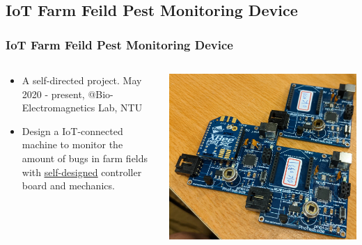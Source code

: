 \documentclass[compress, aspectratio=32]{beamer}
\begin{document}
\subsection{IoT Farm Feild Pest Monitoring Device}
\begin{frame}
    \frametitle{IoT Farm Feild Pest Monitoring Device}
    \begin{columns}
        \begin{column}{0.5\linewidth}
            \begin{itemize}
                \item A self-directed project. May 2020 - present, @Bio-Electromagnetics Lab, NTU
                \item Design a IoT-connected machine to monitor the amount of bugs in farm fields with \href{https://bencer3283.github.io/experiences/Iot/}{\underline{self-designed}} controller board and mechanics.
            \end{itemize}
        \end{column}
        \begin{column}{0.5\linewidth}
            \includegraphics[width=\linewidth]{3pGto7b.jpg}
        \end{column}
    \end{columns}
\end{frame}
\end{document}
